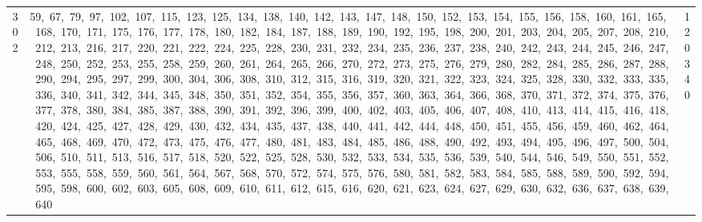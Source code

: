 \begin{longtable}{c|p{}|r}
302 & 59,\ 67,\ 79,\ 97,\ 102,\ 107,\ 115,\ 123,\ 125,\ 134,\ 138,\ 140,\ 142,\ 143,\ 147,\ 148,\ 150,\ 152,\ 153,\ 154,\ 155,\ 156,\ 158,\ 160,\ 161,\ 165,\ 168,\ 170,\ 171,\ 175,\ 176,\ 177,\ 178,\ 180,\ 182,\ 184,\ 187,\ 188,\ 189,\ 190,\ 192,\ 195,\ 198,\ 200,\ 201,\ 203,\ 204,\ 205,\ 207,\ 208,\ 210,\ 212,\ 213,\ 216,\ 217,\ 220,\ 221,\ 222,\ 224,\ 225,\ 228,\ 230,\ 231,\ 232,\ 234,\ 235,\ 236,\ 237,\ 238,\ 240,\ 242,\ 243,\ 244,\ 245,\ 246,\ 247,\ 248,\ 250,\ 252,\ 253,\ 255,\ 258,\ 259,\ 260,\ 261,\ 264,\ 265,\ 266,\ 270,\ 272,\ 273,\ 275,\ 276,\ 279,\ 280,\ 282,\ 284,\ 285,\ 286,\ 287,\ 288,\ 290,\ 294,\ 295,\ 297,\ 299,\ 300,\ 304,\ 306,\ 308,\ 310,\ 312,\ 315,\ 316,\ 319,\ 320,\ 321,\ 322,\ 323,\ 324,\ 325,\ 328,\ 330,\ 332,\ 333,\ 335,\ 336,\ 340,\ 341,\ 342,\ 344,\ 345,\ 348,\ 350,\ 351,\ 352,\ 354,\ 355,\ 356,\ 357,\ 360,\ 363,\ 364,\ 366,\ 368,\ 370,\ 371,\ 372,\ 374,\ 375,\ 376,\ 377,\ 378,\ 380,\ 384,\ 385,\ 387,\ 388,\ 390,\ 391,\ 392,\ 396,\ 399,\ 400,\ 402,\ 403,\ 405,\ 406,\ 407,\ 408,\ 410,\ 413,\ 414,\ 415,\ 416,\ 418,\ 420,\ 424,\ 425,\ 427,\ 428,\ 429,\ 430,\ 432,\ 434,\ 435,\ 437,\ 438,\ 440,\ 441,\ 442,\ 444,\ 448,\ 450,\ 451,\ 455,\ 456,\ 459,\ 460,\ 462,\ 464,\ 465,\ 468,\ 469,\ 470,\ 472,\ 473,\ 475,\ 476,\ 477,\ 480,\ 481,\ 483,\ 484,\ 485,\ 486,\ 488,\ 490,\ 492,\ 493,\ 494,\ 495,\ 496,\ 497,\ 500,\ 504,\ 506,\ 510,\ 511,\ 513,\ 516,\ 517,\ 518,\ 520,\ 522,\ 525,\ 528,\ 530,\ 532,\ 533,\ 534,\ 535,\ 536,\ 539,\ 540,\ 544,\ 546,\ 549,\ 550,\ 551,\ 552,\ 553,\ 555,\ 558,\ 559,\ 560,\ 561,\ 564,\ 567,\ 568,\ 570,\ 572,\ 574,\ 575,\ 576,\ 580,\ 581,\ 582,\ 583,\ 584,\ 585,\ 588,\ 589,\ 590,\ 592,\ 594,\ 595,\ 598,\ 600,\ 602,\ 603,\ 605,\ 608,\ 609,\ 610,\ 611,\ 612,\ 615,\ 616,\ 620,\ 621,\ 623,\ 624,\ 627,\ 629,\ 630,\ 632,\ 636,\ 637,\ 638,\ 639,\ 640 & 120340 \\

\end{longtable}
